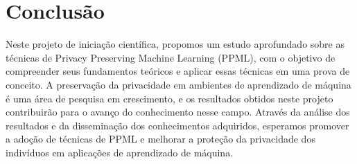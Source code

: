 \documentclass{article}
\begin{document}
\section{Conclusão}
Neste projeto de iniciação científica, propomos um estudo aprofundado sobre as técnicas de Privacy Preserving Machine Learning (PPML), com o objetivo de compreender seus fundamentos teóricos e aplicar essas técnicas em uma prova de conceito. A preservação da privacidade em ambientes de aprendizado de máquina é uma área de pesquisa em crescimento, e os resultados obtidos neste projeto contribuirão para o avanço do conhecimento nesse campo. Através da análise dos resultados e da disseminação dos conhecimentos adquiridos, esperamos promover a adoção de técnicas de PPML e melhorar a proteção da privacidade dos indivíduos em aplicações de aprendizado de máquina.




   
\end{document}
